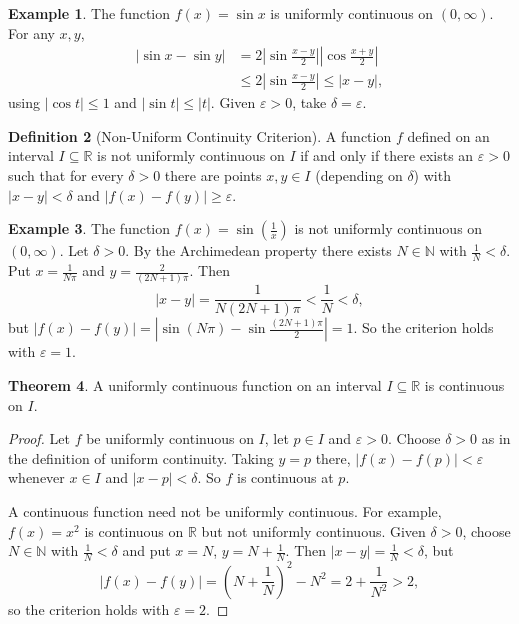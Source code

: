 \documentclass[11pt,a4paper]{article}
\numberwithin{equation}{section}
\theoremstyle{definition}
\newtheorem{thm}{Theorem}[subsection]
\newtheorem{defn}[thm]{Definition}
\newtheorem{exa}[thm]{Example}
\begin{document}
\begin{exa}
The function $f(x) = \sin x$ is uniformly continuous on $(0,\infty)$. For any $x,y$,
\begin{align*}
|\sin x - \sin y| & = 2\left|\sin \frac{x - y}{2}\right|\left|\cos \frac{x + y}{2}\right|\\
& \leq 2\left|\sin \frac{x - y}{2}\right| \leq |x - y|,
\end{align*}
using $|\cos t|\leq 1$ and $|\sin t|\leq |t|$. Given $\varepsilon > 0$, take $\delta = \varepsilon$.
\end{exa}


\begin{defn}[Non-Uniform Continuity Criterion]
A function $f$ defined on an interval $I\subseteq \mathbb{R}$ is not uniformly continuous on $I$ if and only if there exists an $\varepsilon > 0$ such that for every $\delta > 0$ there are points $x, y\in I$ (depending on $\delta$) with $|x - y| < \delta$ and $|f(x) - f(y)|\geq \varepsilon$.
\end{defn}


\begin{exa}
The function $f(x) = \sin\left(\frac{1}{x}\right)$ is not uniformly continuous on $(0,\infty)$. Let $\delta > 0$. By the Archimedean property there exists $N\in \mathbb{N}$ with $\frac{1}{N} < \delta$. Put $x = \frac{1}{N\pi}$ and $y = \frac{2}{(2N  + 1) \pi}$. Then
$$|x - y| = \frac{1}{N(2N + 1)\pi}<\frac{1}{N} < \delta,$$
but $|f(x) - f(y)| = \left|\sin(N\pi) - \sin \frac{(2N + 1)\pi}{2}\right|  = 1$. So the criterion holds with $\varepsilon = 1$.
\end{exa}


\begin{thm}
A uniformly continuous function on an interval $I\subseteq \mathbb{R}$ is continuous on $I$.
\end{thm}

\begin{proof}
Let $f$ be uniformly continuous on $I$, let $p\in I$ and $\varepsilon>0$. Choose $\delta>0$ as in the definition of uniform continuity. Taking $y = p$ there, $|f(x) - f(p)|<\varepsilon$ whenever $x\in I$ and $|x-p|<\delta$. So $f$ is continuous at $p$.

A continuous function need not be uniformly continuous. For example, $f(x) = x^2$ is continuous on $\mathbb{R}$ but not uniformly continuous. Given $\delta > 0$, choose $N\in\mathbb{N}$ with $\frac{1}{N}<\delta$ and put $x  = N$, $y = N + \frac{1}{N}$. Then $|x - y| = \frac{1}{N} < \delta$, but
$$|f(x) - f(y)| = \left(N + \frac{1}{N}\right)^2 - N^2 = 2 + \frac{1}{N^2}> 2 ,$$
so the criterion holds with $\varepsilon = 2$.
\end{proof}
\end{document}
